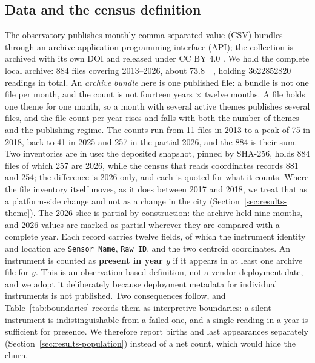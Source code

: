 \documentclass{article}
\newcommand{\nArchiveFiles}{884}
\newcommand{\nArchiveGB}{73.8}
\newcommand{\nArchiveReadings}{3622852820}
\newcommand{\nFilesLast}{257}
\begin{document}
\subsection{Data and the census definition}
\label{sec:data}

The observatory publishes monthly comma-separated-value (CSV) bundles through an
archive application-programming interface (API); the collection is archived with its own
DOI and released under CC BY 4.0 \cite{uo_archive}. We hold the
complete local archive: \num{\nArchiveFiles} files covering 2013--2026, about \SI{\nArchiveGB}{\giga\byte},
holding \num{\nArchiveReadings} readings in total. An \emph{archive bundle} here is one
published file: a bundle is not one file per month, and the count is not fourteen years
$\times$ twelve months. A file holds one theme for one month, so a month with several active
themes publishes several files, and the file count per year rises and falls with both the
number of themes and the publishing regime. The counts run from \num{11} files in 2013 to a
peak of \num{75} in 2018, back to \num{41} in 2025 and \nFilesLast{} in the partial 2026, and the
\nArchiveFiles{} is their sum. Two inventories are in use: the deposited snapshot, pinned by
SHA-256, holds \num{884} files of which \num{257} are 2026, while the census that reads
coordinates records \num{881} and \num{254}; the difference is 2026 only, and each is quoted for
what it counts. Where the file inventory itself moves, as it does between 2017 and 2018, we
treat that as a platform-side change and not as a change in the city
(Section~\ref{sec:results-theme}). The 2026 slice is partial by
construction: the archive held nine months, and 2026 values are marked as partial wherever they
are compared with a complete year. Each record carries twelve
fields, of which the instrument identity and location are \texttt{Sensor~Name},
\texttt{Raw~ID}, and the two centroid coordinates.
An instrument is counted as \textbf{present in year $y$} if it appears in at least one
archive file for $y$. This is an observation-based definition, not a vendor deployment
date, and we adopt it deliberately because deployment metadata for individual
instruments is not published. Two consequences follow, and Table~\ref{tab:boundaries}
records them as interpretive boundaries: a silent instrument is indistinguishable from
a failed one, and a single reading in a year is sufficient for presence. We therefore
report births and last appearances separately (Section~\ref{sec:results-population})
instead of a net count, which would hide the churn.
\end{document}
